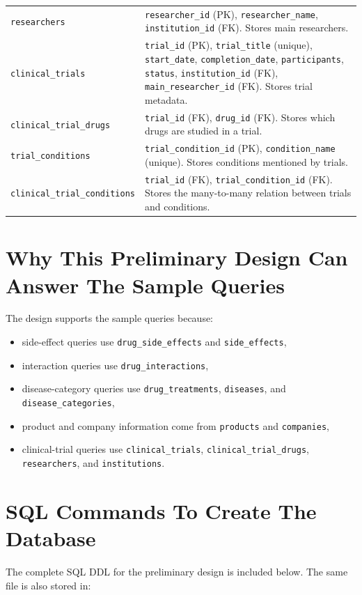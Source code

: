 \documentclass[12pt,a4paper]{article}
\begin{document}
\begin{longtable}{p{} p{}}
\texttt{researchers} & \texttt{researcher\_id} (PK), \texttt{researcher\_name}, \texttt{institution\_id} (FK). Stores main researchers. \\
\texttt{clinical\_trials} & \texttt{trial\_id} (PK), \texttt{trial\_title} (unique), \texttt{start\_date}, \texttt{completion\_date}, \texttt{participants}, \texttt{status}, \texttt{institution\_id} (FK), \texttt{main\_researcher\_id} (FK). Stores trial metadata. \\
\texttt{clinical\_trial\_drugs} & \texttt{trial\_id} (FK), \texttt{drug\_id} (FK). Stores which drugs are studied in a trial. \\
\texttt{trial\_conditions} & \texttt{trial\_condition\_id} (PK), \texttt{condition\_name} (unique). Stores conditions mentioned by trials. \\
\texttt{clinical\_trial\_conditions} & \texttt{trial\_id} (FK), \texttt{trial\_condition\_id} (FK). Stores the many-to-many relation between trials and conditions. \\
\bottomrule
\end{longtable}

\section{Why This Preliminary Design Can Answer The Sample Queries}
The design supports the sample queries because:

\begin{itemize}[leftmargin=1.5em]
    \item side-effect queries use \texttt{drug\_side\_effects} and \texttt{side\_effects},
    \item interaction queries use \texttt{drug\_interactions},
    \item disease-category queries use \texttt{drug\_treatments}, \texttt{diseases}, and \texttt{disease\_categories},
    \item product and company information come from \texttt{products} and \texttt{companies},
    \item clinical-trial queries use \texttt{clinical\_trials}, \texttt{clinical\_trial\_drugs}, \texttt{researchers}, and \texttt{institutions}.
\end{itemize}

\section{SQL Commands To Create The Database}
The complete SQL DDL for the preliminary design is included below. The same file is also stored in:
\end{document}
